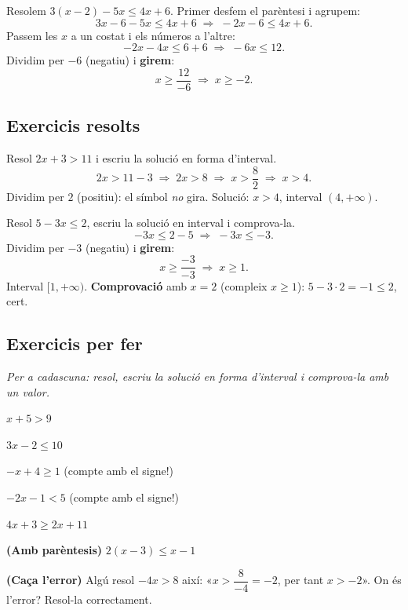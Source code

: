 \begin{exemple}
Resolem $3(x-2)-5x\le 4x+6$. Primer desfem el parèntesi i agrupem:
\[
3x-6-5x\le 4x+6 \;\Rightarrow\; -2x-6\le 4x+6.
\]
Passem les $x$ a un costat i els números a l'altre:
\[
-2x-4x\le 6+6 \;\Rightarrow\; -6x\le 12.
\]
Dividim per $-6$ (negatiu) i \textbf{girem}:
\[
x\ge \frac{12}{-6} \;\Rightarrow\; x\ge -2.
\]
\end{exemple}

\subsection{Exercicis resolts}

\begin{exresolt}
Resol $2x+3>11$ i escriu la solució en forma d'interval.
\solucio
\[
2x>11-3 \;\Rightarrow\; 2x>8 \;\Rightarrow\; x>\frac{8}{2} \;\Rightarrow\; x>4.
\]
Dividim per $2$ (positiu): el símbol \emph{no} gira. Solució: $x>4$, interval
$(4,+\infty)$.
\end{exresolt}

\begin{exresolt}
Resol $5-3x\le 2$, escriu la solució en interval i comprova-la.
\solucio
\[
-3x\le 2-5 \;\Rightarrow\; -3x\le -3.
\]
Dividim per $-3$ (negatiu) i \textbf{girem}:
\[
x\ge \frac{-3}{-3} \;\Rightarrow\; x\ge 1.
\]
Interval $[1,+\infty)$. \textbf{Comprovació} amb $x=2$ (compleix $x\ge 1$):
$5-3\cdot 2=-1\le 2$, cert.
\resposta{$x\ge 1$, interval $[1,+\infty)$.}
\end{exresolt}

\subsection{Exercicis per fer}

\noindent\textit{Per a cadascuna: resol, escriu la solució en forma d'interval i
comprova-la amb un valor.}

\begin{exercicis}
\begin{exlist}
  \item $x+5>9$
  \item $3x-2\le 10$
  \item $-x+4\ge 1$ \quad (compte amb el signe!)
  \item $-2x-1<5$ \quad (compte amb el signe!)
  \item $4x+3\ge 2x+11$
  \item \textbf{(Amb parèntesis)} $2(x-3)\le x-1$
  \item \textbf{(Caça l'error)} Algú resol $-4x>8$ així: «$x>\dfrac{8}{-4}=-2$, per
        tant $x>-2$». On és l'error? Resol-la correctament.
\end{exlist}
\end{exercicis}

